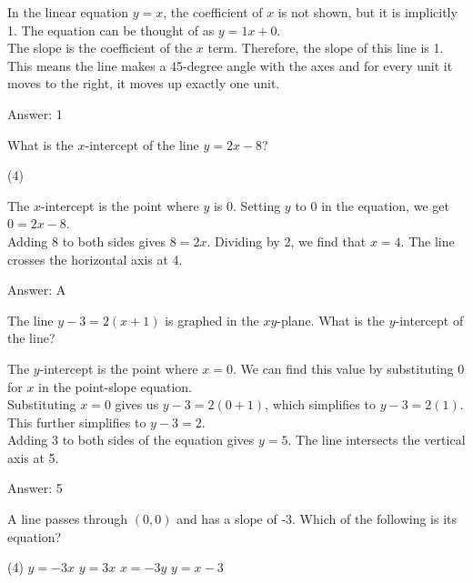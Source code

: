 \documentclass[11pt,paper=a4,answers]{exam}
\begin{document}
\begin{questions}
\begin{solution}
In the linear equation $y = x$, the coefficient of $x$ is not shown, but it is implicitly 1. The equation can be thought of as $y = 1x + 0$.
\\[10pt]
The slope is the coefficient of the $x$ term. Therefore, the slope of this line is 1. This means the line makes a 45-degree angle with the axes and for every unit it moves to the right, it moves up exactly one unit.

\vspace{15pt}
Answer: \colorbox{yellow!100}{1}
\end{solution}

\question
What is the $x$-intercept of the line $y = 2x - 8$?
\begin{tasks}(4)
\end{tasks}

\begin{solution}
The $x$-intercept is the point where $y$ is 0. Setting $y$ to 0 in the equation, we get $0 = 2x - 8$. 
\\[10pt]
Adding 8 to both sides gives $8 = 2x$. Dividing by 2, we find that $x = 4$. The line crosses the horizontal axis at 4.

\vspace{15pt}
Answer: \colorbox{yellow!100}{A}
\end{solution}

\question
The line $y - 3 = 2(x + 1)$ is graphed in the $xy$-plane. What is the $y$-intercept of the line?

\begin{solution}
The $y$-intercept is the point where $x = 0$. We can find this value by substituting 0 for $x$ in the point-slope equation.
\\[10pt]
Substituting $x = 0$ gives us $y - 3 = 2(0 + 1)$, which simplifies to $y - 3 = 2(1)$. This further simplifies to $y - 3 = 2$.
\\[10pt]
Adding 3 to both sides of the equation gives $y = 5$. The line intersects the vertical axis at 5.

\vspace{15pt}
Answer: \colorbox{yellow!100}{5}
\end{solution}

\question
A line passes through $(0, 0)$ and has a slope of -3. Which of the following is its equation?
\begin{tasks}(4)
    \task $y = -3x$
    \task $y = 3x$
    \task $x = -3y$
    \task $y = x - 3$
\end{tasks}


\end{questions}
\end{document}
